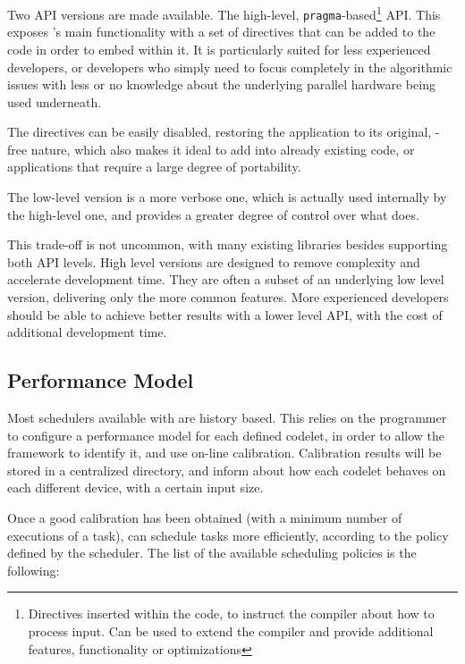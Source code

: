 \documentclass[main.tex]{subfiles}
\begin{document}
Two API versions are made available. The high-level, \texttt{pragma}-based\footnote{Directives inserted within the code, to instruct the compiler about how to process input. Can be used to extend the compiler and provide additional features, functionality or optimizations} API. This exposes \starpu's main functionality with a set of directives that can be added to the code in order to embed \starpu within it. It is particularly suited for less experienced developers, or developers who simply need to focus completely in the algorithmic issues with less or no knowledge about the underlying parallel hardware being used underneath.

The directives can be easily disabled, restoring the application to its original, \starpu-free nature, which also makes it ideal to add \starpu into already existing code, or applications that require a large degree of portability.

The low-level version is a more verbose one, which is actually used internally by the high-level one, and provides a greater degree of control over what \starpu does.

This trade-off is not uncommon, with many existing libraries besides \starpu supporting both API levels. High level versions are designed to remove complexity and accelerate development time. They are often a subset of an underlying low level version, delivering only the more common features. More experienced developers should be able to achieve better results with a lower level API, with the cost of additional development time.

\subsection{Performance Model}

Most schedulers available with \starpu are history based. This relies on the programmer to configure a performance model for each defined codelet, in order to allow the framework to identify it, and use on-line calibration. Calibration results will be stored in a centralized directory, and inform \starpu about how each codelet behaves on each different device, with a certain input size.

Once a good calibration has been obtained (with a minimum number of executions of a task), \starpu can schedule tasks more efficiently, according to the policy defined by the scheduler. The list of the available scheduling policies is the following:
\end{document}
